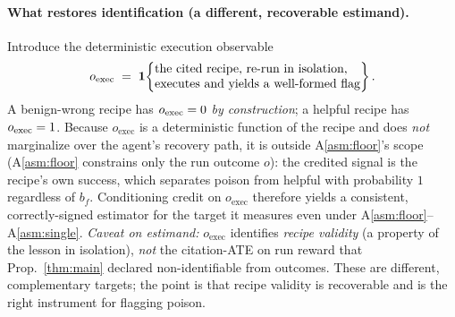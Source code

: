 \paragraph{What restores identification (a different, recoverable estimand).}
\begin{proposition}\label{thm:recovery}
Introduce the deterministic execution observable
\[
o_{\mathrm{exec}} \;\eqd\; \mathbf 1\!\left\{
\begin{array}{@{}l@{}}
\text{the cited recipe, re-run in isolation,}\\
\text{executes and yields a well-formed flag}
\end{array}\right\}.
\]
A benign-wrong recipe has $o_{\mathrm{exec}}=0$ \emph{by construction}; a helpful
recipe has $o_{\mathrm{exec}}=1$. Because $o_{\mathrm{exec}}$ is a deterministic
function of the recipe and does \emph{not} marginalize over the agent's recovery path,
it is outside A\ref{asm:floor}'s scope (A\ref{asm:floor} constrains only the run
outcome $o$): the credited signal is the recipe's own success, which
separates poison from helpful with probability $1$ regardless of $b_f$. Conditioning
credit on $o_{\mathrm{exec}}$ therefore yields a consistent, correctly-signed estimator
for the target it measures even under A\ref{asm:floor}--A\ref{asm:single}.
\emph{Caveat on estimand:} $o_{\mathrm{exec}}$ identifies \emph{recipe validity} (a
property of the lesson in isolation), \emph{not} the citation-ATE on run reward that
Prop.~\ref{thm:main} declared non-identifiable from outcomes. These are different,
complementary targets; the point is that recipe validity is recoverable and is the
right instrument for flagging poison.
\end{proposition}
